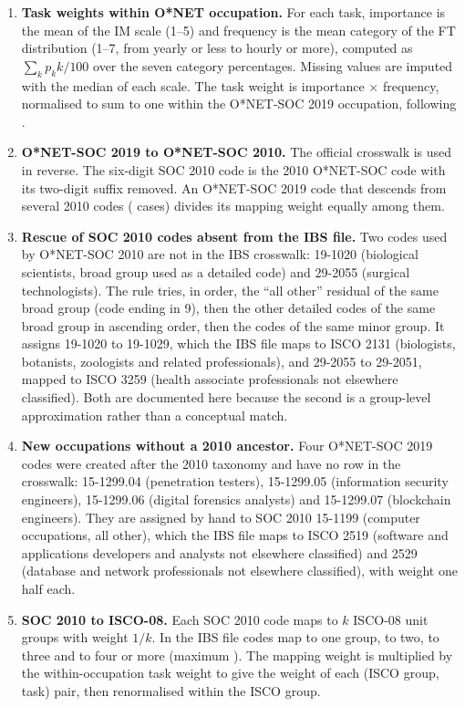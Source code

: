 \begin{enumerate}
  \item \textbf{Task weights within O*NET occupation.} For each task, importance is the mean of the IM scale (1--5) and frequency is the mean category of the FT distribution (1--7, from yearly or less to hourly or more), computed as $\sum_k p_k k / 100$ over the seven category percentages. Missing values are imputed with the median of each scale. The task weight is importance $\times$ frequency, normalised to sum to one within the O*NET-SOC 2019 occupation, following \citet{acemoglu2011skills}.
  \item \textbf{O*NET-SOC 2019 to O*NET-SOC 2010.} The official crosswalk is used in reverse. The six-digit SOC 2010 code is the 2010 O*NET-SOC code with its two-digit suffix removed. An O*NET-SOC 2019 code that descends from several 2010 codes ( cases) divides its mapping weight equally among them.
  \item \textbf{Rescue of SOC 2010 codes absent from the IBS file.} Two codes used by O*NET-SOC 2010 are not in the IBS crosswalk: 19-1020 (biological scientists, broad group used as a detailed code) and 29-2055 (surgical technologists). The rule tries, in order, the ``all other'' residual of the same broad group (code ending in 9), then the other detailed codes of the same broad group in ascending order, then the codes of the same minor group. It assigns 19-1020 to 19-1029, which the IBS file maps to ISCO 2131 (biologists, botanists, zoologists and related professionals), and 29-2055 to 29-2051, mapped to ISCO 3259 (health associate professionals not elsewhere classified). Both are documented here because the second is a group-level approximation rather than a conceptual match.
  \item \textbf{New occupations without a 2010 ancestor.} Four O*NET-SOC 2019 codes were created after the 2010 taxonomy and have no row in the crosswalk: 15-1299.04 (penetration testers), 15-1299.05 (information security engineers), 15-1299.06 (digital forensics analysts) and 15-1299.07 (blockchain engineers). They are assigned by hand to SOC 2010 15-1199 (computer occupations, all other), which the IBS file maps to ISCO 2519 (software and applications developers and analysts not elsewhere classified) and 2529 (database and network professionals not elsewhere classified), with weight one half each.
  \item \textbf{SOC 2010 to ISCO-08.} Each SOC 2010 code maps to $k$ ISCO-08 unit groups with weight $1/k$. In the IBS file  codes map to one group,  to two,  to three and  to four or more (maximum ). The mapping weight is multiplied by the within-occupation task weight to give the weight of each (ISCO group, task) pair, then renormalised within the ISCO group.

\end{enumerate}
